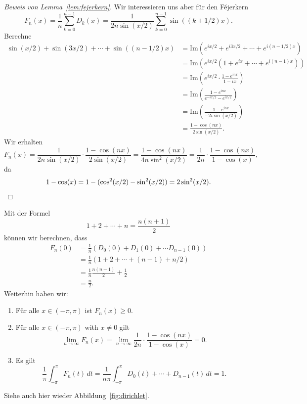 \documentclass[../main.tex]{subfiles}
\begin{document}
\begin{proof}[Beweis von Lemma~\ref{lem:fejerkern}]
  
  Wir interessieren uns aber für den Féjerkern
  \[
    F_n(x) = \frac{1}{n} \sum_{k=0}^{n-1} D_k(x)
    =\frac{1}{2n \sin(x/2)} \sum_{k=0}^{n-1} \sin((k + 1/2)x).
  \]
  Berechne
  \begin{align*}
     \sin(x/2) + \sin(3x/2) + \cdots + \sin((n-1/2)x)
     &= \text{Im}(e^{ix/2} + e^{i3x/2} + \cdots + e^{i(n-1/2)x})  \\
     &= \text{Im}(e^{ix/2}(1 + e^{ix} + \cdots + e^{i(n-1)x}))\\
     &= \text{Im} \left( e^{ix/2} \cdot \frac{1 - e^{inx}}{1 - ix} \right)\\
     &= \text{Im} \left( \frac{1 - e^{inx}}{e^{-ix/2} - e^{ix/2}} \right)\\
     &= \text{Im} \left( \frac{1 - e^{inx}}{-2i \sin(x/2)} \right)\\
     &= \frac{1- \cos(nx)}{2 \sin(x/2)}.
  \end{align*}
  Wir erhalten
  \[
    F_n(x) = \frac{1}{2n \sin(x/2)} \cdot \frac{1 - \cos(nx)}{2 \sin(x/2)}
    =\frac{1 - \cos(nx)}{4n \sin^2(x/2)}
    = \frac{1}{2n} \cdot \frac{1 - \cos(nx)}{1 - \cos(x)},
  \]
  da
  \[
    1 - \cos(x) = 1 - (\cos^2(x/2) - \sin^2(x/2))
    = 2 \sin^2(x/2). \qedhere
  \]
\end{proof}

Mit der Formel
\[
  1 + 2 + \cdots + n = \frac{n(n+1)}{2}
\]
können wir berechnen, dass
\begin{align*}
   F_n(0) 
   & = \frac{1}{n} (D_0(0) + D_1(0) + \cdots D_{n-1}(0)) \\
   &= \frac{1}{n}(1 + 2 + \cdots + (n-1) + n/2) \\
   &= \frac{1}{n} \frac{n(n-1)}{2} + \frac{1}{2}\\
   &= \frac{n}{2}.
\end{align*}
Weiterhin haben wir:
\begin{enumerate}[(1)]
  \item Für alle $x \in (-\pi, \pi)$ ist $F_n(x) \geq 0$.
  \item Für alle $x \in (- \pi, \pi)$ with $x \neq 0$ 
    gilt 
    \[
    \lim_{n \to \infty} F_n(x) = \lim_{n \to \infty}
    \frac{1}{2n} \cdot \frac{1 - \cos(nx)}{1 - \cos(x)} = 0.
    \]
  \item Es gilt
    \[
      \frac{1}{\pi} \int_{-\pi}^{\pi} F_n(t) \, dt
      = \frac{1}{n\pi}\int_{-\pi}^{\pi} D_0(t) + \cdots + D_{n-1}(t) \, dt = 1.
    \]
\end{enumerate}
Siehe auch hier wieder Abbildung~\ref{fig:dirichlet}.
\end{document}
